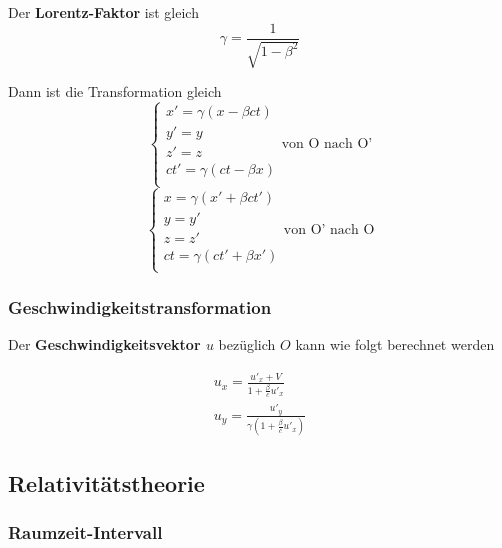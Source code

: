 \documentclass[7pt]{article}
\begin{document}
\begin{multicols*}{3}
Der \textbf{Lorentz-Faktor} ist gleich
\begin{equation*}
	\gamma = \frac{1}{\sqrt{1-\beta^2}}
\end{equation*}

Dann ist die Transformation gleich
\begin{equation*}
		\left\{
		\begin{array}{ll}
        	x' = \gamma(x - \beta ct) \\
            y' = y \\
            z' = z \\
            ct' = \gamma(ct - \beta x) \\
		\end{array}
	\right.
	\text{von O nach O'}
\end{equation*}
\begin{equation*}
		\left\{
		\begin{array}{ll}
        	x = \gamma(x' + \beta ct') \\
            y = y' \\
            z = z' \\
            ct = \gamma(ct' + \beta x') \\
		\end{array}
	\right.
	\text{von O' nach O}
\end{equation*}

\subsubsection{Geschwindigkeitstransformation}

Der \textbf{Geschwindigkeitsvektor $u$} bezüglich $O$ kann wie folgt berechnet werden

\begin{equation*}
	\begin{array}{ll}
		u_x = \frac{u'_x + V}{1 + \frac{\beta}{c}u'_x} \\
		u_y = \frac{u'_y}{\gamma(1+\frac{\beta}{c}u'_x)}
	\end{array}
\end{equation*}

\subsection{Relativitätstheorie}

\subsubsection{Raumzeit-Intervall}


\end{multicols*}
\end{document}
